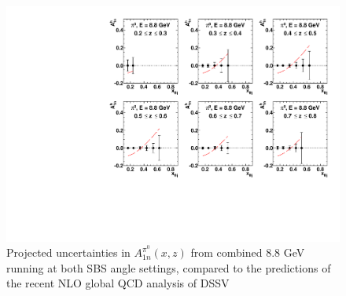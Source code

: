 \begin{figure}[h]
  \begin{center}
    \includegraphics[width=.75\textwidth]{figures/A1n_vs_x_E88_pi0.pdf}
  \end{center}
  \caption{\label{A1n_pi0_88gev} Projected uncertainties in $A_{1n}^{\pi^0}(x,z)$ from combined 8.8 GeV running at both SBS angle settings, compared to the predictions of the recent NLO global QCD analysis of DSSV~\cite{DSSVplus}}
\end{figure}
